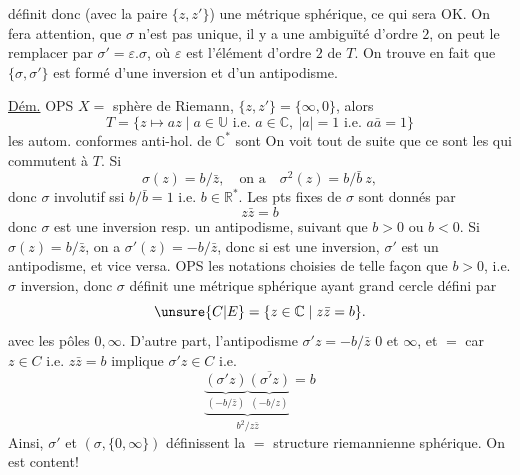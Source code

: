 définit donc (avec la paire $\{z,z'\}$) une métrique sphérique, ce qui sera OK. On fera attention, que $\sigma$ n'est pas unique, il y a une ambiguïté d'ordre $2$, on peut le remplacer par $\sigma'=\varepsilon.\sigma$, où $\varepsilon$ est l'élément d'ordre $2$ de $T$. On trouve en fait que $\{\sigma,\sigma'\}$ est formé d'une inversion et d'un antipodisme.

\uline{Dém.} OPS $X=$ sphère de Riemann, $\{z,z'\}=\{\infty,0\}$, alors
\[
T=\{z\longmapsto az\mid a\in\mathbb U\text{ i.e. }a\in\mathbb C,\ |a|=1\text{ i.e. }a\bar a=1\}
\]
les  autom. conformes anti-hol. de $\mathbb C^*$ sont
On voit tout de suite que ce sont les \uline{} qui commutent à $T$.  Si
\[
\sigma(z)=b/\bar z,\quad\text{on a}\quad\sigma^2(z)=b/\bar b\ z,
\]
donc $\sigma$ involutif ssi $b/\bar b=1$ i.e. $b\in\mathbb R^*$. Les pts fixes de $\sigma$ sont donnés par
\[
z\bar z=b
\]
 donc $\sigma$ est une inversion resp. un antipodisme, suivant que  $b>0$ ou $b<0$. Si $\sigma(z)=b/\bar z$, on a $\sigma'(z)=-b/\bar z$,  donc si \inserted{$\sigma$} est une inversion, $\sigma'$ est un antipodisme, et vice versa. OPS les notations choisies de telle façon que $b>0$, i.e. $\sigma$ inversion, donc $\sigma$ définit une métrique sphérique ayant  grand cercle défini par
\[
\unsure{C|E}=\{z\in\mathbb C\mid z\bar z=b\}.
\]
avec les pôles $0,\infty$. D'autre part, l'antipodisme $\sigma'z=-b/\bar z$  $0$ et $\infty$, et  $=$ car $z\in C$ i.e. $z\bar z=b$ implique $\sigma'z\in C$ i.e.
\[
\underbrace{\underbrace{(\sigma'z)}_{(-b/\bar z)}\underbrace{\overline{(\sigma'z)}}_{(-b/z)}}_{b^2/z\bar z}=b
\]
Ainsi, $\sigma'$ et $(\sigma,\{0,\infty\})$ définissent la $=$ structure riemannienne sphérique. On est content!

